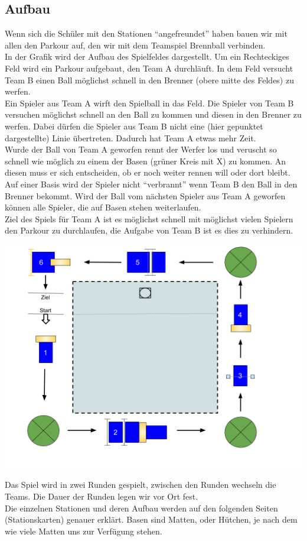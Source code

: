 \documentclass[ngerman,12pt,titlepage]{scrartcl}
\begin{document}
\subsection{Aufbau}
Wenn sich die Schüler mit den Stationen \enquote{angefreundet} haben bauen wir mit allen den Parkour auf, den wir mit dem Teamspiel Brennball verbinden. \\ In der Grafik wird der Aufbau des Spielfeldes dargestellt. Um ein Rechteckiges Feld wird ein Parkour aufgebaut, den Team A durchläuft. In dem Feld versucht Team B einen Ball möglichst schnell in den Brenner (obere mitte des Feldes) zu werfen. \\ Ein Spieler aus Team A wirft den Spielball in das Feld. Die Spieler von Team B versuchen möglichst schnell an den Ball zu kommen und diesen in den Brenner zu werfen. Dabei dürfen die Spieler aus Team B nicht eine (hier gepunktet dargestellte) Linie übertreten. Dadurch hat Team A etwas mehr Zeit. \\ Wurde der Ball von Team A geworfen rennt der Werfer los und veruscht so schnell wie möglich zu einem der Basen (grüner Kreis mit X) zu kommen. An diesen muss er sich entscheiden, ob er noch weiter rennen will oder dort bleibt. \\ Auf einer Basis wird der Spieler nicht \enquote{verbrannt} wenn Team B den Ball in den Brenner bekommt. Wird der Ball vom nächsten Spieler aus Team A geworfen können alle Spieler, die auf Basen stehen weiterlaufen. \\  Ziel des Spiels für Team A ist es möglichst schnell mit möglichst vielen Spielern den Parkour zu durchlaufen, die Aufgabe von Team B ist es dies zu verhindern.  
  
\begin{center}
\includegraphics[width=0.9\linewidth]{brennball}
\end{center}
Das Spiel wird in zwei Runden gespielt, zwischen den Runden wechseln die Teams. Die Dauer der Runden legen wir vor Ort fest.
\\
Die einzelnen Stationen und deren Aufbau werden auf den folgenden Seiten (Stationskarten) genauer erklärt. Basen sind Matten, oder Hütchen, je nach dem wie viele Matten uns zur Verfügung stehen.
\end{document}
